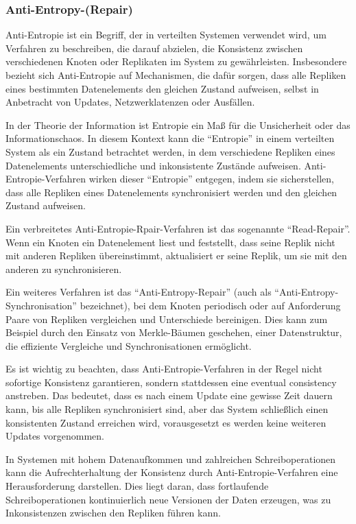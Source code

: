 \subsubsection{Anti-Entropy-(Repair)}
Anti-Entropie ist ein Begriff, der in verteilten Systemen verwendet wird, um Verfahren zu beschreiben, die darauf abzielen, die Konsistenz zwischen verschiedenen Knoten oder Replikaten im System zu gewährleisten. Insbesondere bezieht sich Anti-Entropie auf Mechanismen, die dafür sorgen, dass alle Repliken eines bestimmten Datenelements den gleichen Zustand aufweisen, selbst in Anbetracht von Updates, Netzwerklatenzen oder Ausfällen.

In der Theorie der Information ist Entropie ein Maß für die Unsicherheit oder das Informationschaos. In diesem Kontext kann die \enquote{Entropie} in einem verteilten System als ein Zustand betrachtet werden, in dem verschiedene Repliken eines Datenelements unterschiedliche und inkonsistente Zustände aufweisen. Anti-Entropie-Verfahren wirken dieser \enquote{Entropie} entgegen, indem sie sicherstellen, dass alle Repliken eines Datenelements synchronisiert werden und den gleichen Zustand aufweisen.

Ein verbreitetes Anti-Entropie-Rpair-Verfahren ist das sogenannte \enquote{Read-Repair}. Wenn ein Knoten ein Datenelement liest und feststellt, dass seine Replik nicht mit anderen Repliken übereinstimmt, aktualisiert er seine Replik, um sie mit den anderen zu synchronisieren.

Ein weiteres Verfahren ist das \enquote{Anti-Entropy-Repair} (auch als \enquote{Anti-Entropy-Synchronisation} bezeichnet), bei dem Knoten periodisch oder auf Anforderung Paare von Repliken vergleichen und Unterschiede bereinigen. Dies kann zum Beispiel durch den Einsatz von Merkle-Bäumen geschehen, einer Datenstruktur, die effiziente Vergleiche und Synchronisationen ermöglicht.

Es ist wichtig zu beachten, dass Anti-Entropie-Verfahren in der Regel nicht sofortige Konsistenz garantieren, sondern stattdessen eine eventual consistency anstreben. Das bedeutet, dass es nach einem Update eine gewisse Zeit dauern kann, bis alle Repliken synchronisiert sind, aber das System schließlich einen konsistenten Zustand erreichen wird, vorausgesetzt es werden keine weiteren Updates vorgenommen.

In Systemen mit hohem Datenaufkommen und zahlreichen Schreiboperationen kann die Aufrechterhaltung der Konsistenz durch Anti-Entropie-Verfahren eine Herausforderung darstellen. Dies liegt daran, dass fortlaufende Schreiboperationen kontinuierlich neue Versionen der Daten erzeugen, was zu Inkonsistenzen zwischen den Repliken führen kann.

